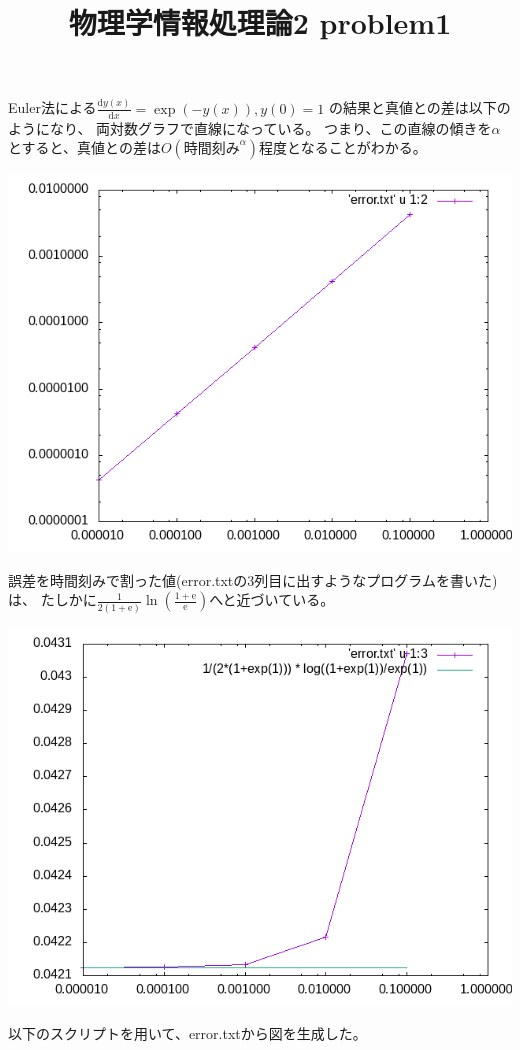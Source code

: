 \documentclass[12pt,a5]{bxjsarticle}
\title{物理学情報処理論2 problem1}
\date{}
\newcommand{\e}{\mathrm{e}}
\begin{document}
\maketitle

Euler法による$ \frac{\mathrm{d}y(x)}{\mathrm{d}x} = \exp(-y(x)), y(0) = 1 $ の結果と真値との差は以下のようになり、
両対数グラフで直線になっている。
つまり、この直線の傾きを$ \alpha $とすると、真値との差は$ O(\mbox{時間刻み}^\alpha) $程度となることがわかる。

\includegraphics[width=\linewidth]{error.png}

誤差を時間刻みで割った値(error.txtの3列目に出すようなプログラムを書いた)は、
たしかに$ \frac{1}{2(1+\e)} \ln(\frac{1+\e}{\e}) $へと近づいている。

\includegraphics[width=\linewidth]{error-per-delta.png}

以下のスクリプトを用いて、error.txtから図を生成した。

\end{document}
